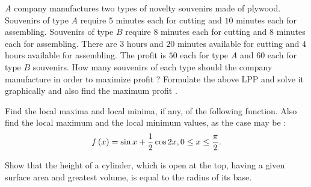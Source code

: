 \item $A$ company manufactures two types of novelty souvenirs made of plywood. Souvenirs of type $A$ require $5$ minutes each for cutting and $10$ minutes each for assembling. Souvenirs of type $B$ require $8$ minutes each for cutting and $8$ minutes each for assembling. There are $3$ hours and $20$ minutes available for cutting and $4$ hours available for  assembling. The profit is \rupee $50$ each for type $A$ and \rupee $60$  each for type $B$ souvenirs. How many souvenirs of each type should the company manufacture in order to maximize profit ? Formulate the above LPP and solve it graphically and also find the maximum profit .

\item Find the local maxima and local minima, if any, of the following function. Also find the local maximum and the local minimum values, as the case may be :
\begin{align*}
    f\left(x\right)=\sin x + \dfrac{1}{2} \cos 2x,0\leq x \leq \dfrac{\pi}{2}.
\end{align*}

\item Show that the height of a cylinder, which is open at the top, having a given surface area and greatest volume, is equal to the radius of its base.

